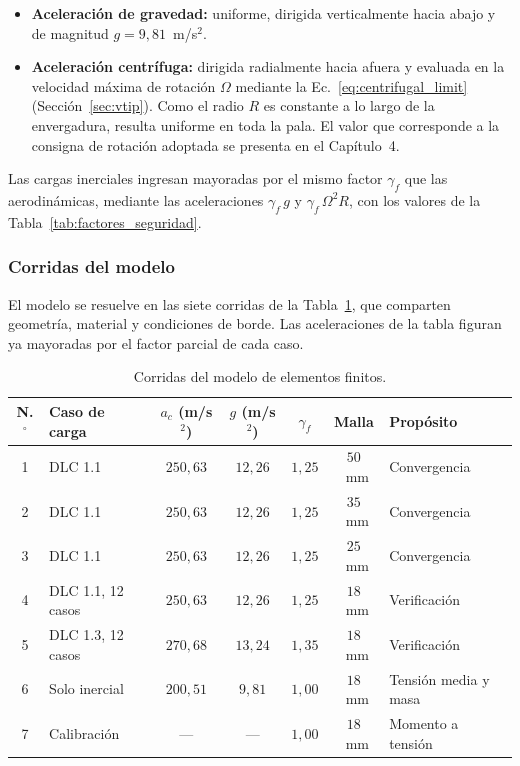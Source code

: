 \begin{itemize}
    \item \textbf{Aceleración de gravedad:} uniforme, dirigida verticalmente hacia abajo y de magnitud $g = 9{,}81$~m/s$^2$.
    \item \textbf{Aceleración centrífuga:} dirigida radialmente hacia afuera y evaluada en la velocidad máxima de rotación $\Omega$ mediante la Ec.~\ref{eq:centrifugal_limit} (Sección~\ref{sec:vtip}). Como el radio $R$ es constante a lo largo de la envergadura, resulta uniforme en toda la pala. El valor que corresponde a la consigna de rotación adoptada se presenta en el Capítulo~4.
\end{itemize}

Las cargas inerciales ingresan mayoradas por el mismo factor $\gamma_f$ que las aerodinámicas, mediante las aceleraciones $\gamma_f \, g$ y $\gamma_f \, \Omega^2 R$, con los valores de la Tabla~\ref{tab:factores_seguridad}.

\subsubsection{Corridas del modelo}
\label{sec:corridas_fem}

El modelo se resuelve en las siete corridas de la Tabla~\ref{tab:corridas_fem}, que comparten geometría, material y condiciones de borde. Las aceleraciones de la tabla figuran ya mayoradas por el factor parcial de cada caso.

\begin{table}[H]
    \centering
    \caption{Corridas del modelo de elementos finitos.}
    \label{tab:corridas_fem}
    \begin{tabular}{clccccl}
        \hline
        \textbf{N.$^\circ$} & \textbf{Caso de carga} & \textbf{$a_c$ (m/s$^2$)} & \textbf{$g$ (m/s$^2$)} & \textbf{$\gamma_f$} & \textbf{Malla} & \textbf{Propósito}\\
        \hline
        1 & DLC 1.1 & $250{,}63$ & $12{,}26$ & $1{,}25$ & $50$~mm & Convergencia\\
        2 & DLC 1.1 & $250{,}63$ & $12{,}26$ & $1{,}25$ & $35$~mm & Convergencia\\
        3 & DLC 1.1 & $250{,}63$ & $12{,}26$ & $1{,}25$ & $25$~mm & Convergencia\\
        4 & DLC 1.1, 12 casos & $250{,}63$ & $12{,}26$ & $1{,}25$ & $18$~mm & Verificación\\
        5 & DLC 1.3, 12 casos & $270{,}68$ & $13{,}24$ & $1{,}35$ & $18$~mm & Verificación\\
        6 & Solo inercial & $200{,}51$ & $9{,}81$ & $1{,}00$ & $18$~mm & Tensión media y masa\\
        7 & Calibración & --- & --- & $1{,}00$ & $18$~mm & Momento a tensión\\
        \hline
    \end{tabular}
\end{table}

